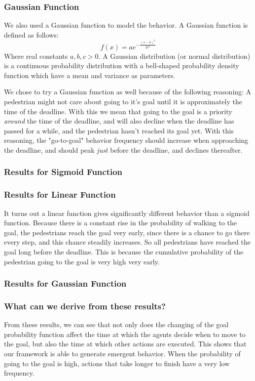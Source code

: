 \documentclass[11pt]{book}
\begin{document}
\subsubsection{Gaussian Function}
We also used a Gaussian function to model the behavior. A Gaussian function is defined as follows:
\begin{equation}f(x) = ae^{- \frac{(x-b)^2}{2c^2}}\end{equation}
Where real constants $a, b, c > 0 $. A Gaussian distribution (or normal distribution) is a continuous probability distribution with a bell-shaped probability density function which have a mean and variance as parameters.



We chose to try a Gaussian function as well because of the following reasoning: A pedestrian might not care about going to it's goal until it is approximately the time of the deadline. With this we mean that going to the goal is a priority \emph{around} the time of the deadline, and will also decline when the deadline has passed for a while, and the pedestrian hasn't reached its goal yet. With this reasoning, the "go-to-goal" behavior frequency should increase when approaching the deadline, and should peak \emph{just} before the deadline, and declines thereafter.

\subsubsection{Results for Sigmoid Function}


\subsubsection{Results for Linear Function}
It turns out a linear function gives significantly different behavior than a sigmoid function. Because there is a constant rise in the probability of walking to the goal, the pedestrians reach the goal very early, since there is a chance to go there every step, and this chance steadily increases. So all pedestrians have reached the goal long before the deadline. This is because the cumulative probability of the pedestrian going to the goal is very high very early.

\subsubsection{Results for Gaussian Function}


\subsubsection{What can we derive from these results?}
From these results, we can see that not only does the changing of the goal probability function affect the time at which the agents decide when to move to the goal, but also the time at which other actions are executed. This shows that our framework is able to generate emergent behavior. When the probability of going to the goal is high, actions that take longer to finish have a very low frequency.
\end{document}
